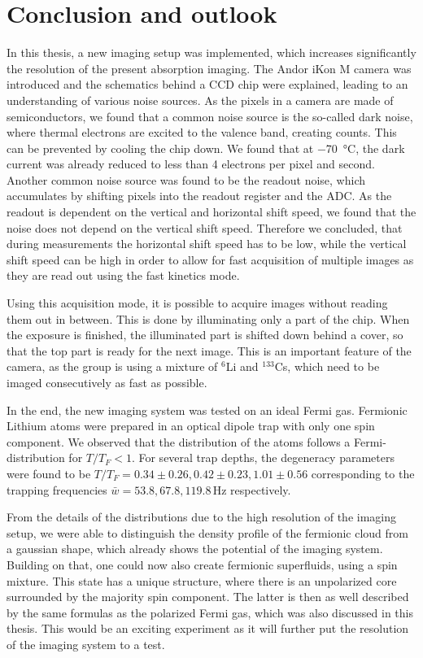 \chapter{Conclusion and outlook}

In this thesis, a new imaging setup was implemented, which increases significantly the resolution of the present absorption imaging. The Andor iKon M camera was introduced and the schematics behind a CCD chip were explained, leading to an understanding of various noise sources. As the pixels in a camera are made of semiconductors, we found that a common noise source is the so-called dark noise, where thermal electrons are excited to the valence band, creating counts. This can be prevented by cooling the chip down. We found that at \SI{-70}{\degreeCelsius}, the dark current was already reduced to less than 4 electrons per pixel and second. Another common noise source was found to be the readout noise, which accumulates by shifting pixels into the readout register and the ADC.
As the readout is dependent on the vertical and horizontal shift speed, we found that the noise does not depend on the vertical shift speed. Therefore we concluded, that during measurements the horizontal shift speed has to be low, while the vertical shift speed can be high in order to allow for fast acquisition of multiple images as they are read out using the fast kinetics mode.

Using this acquisition mode, it is possible to acquire images without reading them out in between. This is done by illuminating only a part of the chip. When the exposure is finished, the illuminated part is shifted down behind a cover, so that the top part is ready for the next image. This is an important feature of the camera, as the group is using a mixture of $^6$Li and $^{133}$Cs, which need to be imaged consecutively as fast as possible.

In the end, the new imaging system was tested on an ideal Fermi gas. Fermionic Lithium atoms were prepared in an optical dipole trap with only one spin component. We observed that the distribution of the atoms follows a Fermi-distribution for $T/T_F < 1$. For several trap depths, the degeneracy parameters were found to be $T/T_F= 0.34\pm0.26, 0.42\pm0.23, 1.01\pm0.56$ corresponding to the trapping frequencies $\bar{w}=53.8, 67.8, 119.8 \,\mathrm{Hz}$ respectively.

From the details of the distributions due to the high resolution of the imaging setup, we were able to distinguish the density profile of the fermionic cloud from a gaussian shape, which already shows the potential of the imaging system. Building on that, one could now also create fermionic superfluids, using a spin mixture. This state has a unique structure, where there is an unpolarized core surrounded by the majority spin component\cite{Shin2006,Zwierlein2006b}. The latter is then as well described by the same formulas as the polarized Fermi gas, which was also discussed in this thesis. This would be an exciting experiment as it will further put the resolution of the imaging system to a test.
